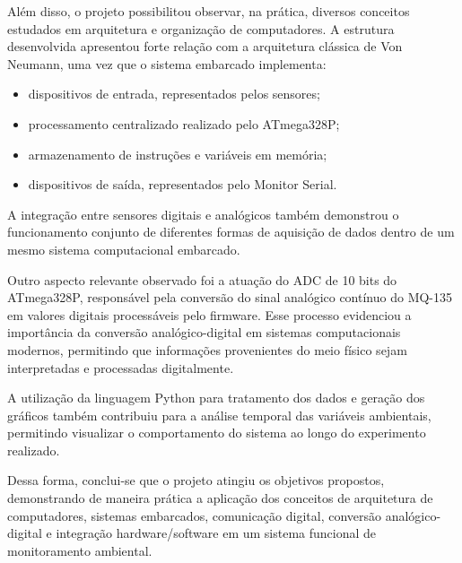 \documentclass[a4paper,12pt]{article}
\begin{document}
Além disso, o projeto possibilitou observar, na prática, diversos conceitos estudados em arquitetura e organização de computadores. A estrutura desenvolvida apresentou forte relação com a arquitetura clássica de Von Neumann, uma vez que o sistema embarcado implementa:
\begin{itemize}
    \item dispositivos de entrada, representados pelos sensores;
    \item processamento centralizado realizado pelo ATmega328P;
    \item armazenamento de instruções e variáveis em memória;
    \item dispositivos de saída, representados pelo Monitor Serial.
\end{itemize}

A integração entre sensores digitais e analógicos também demonstrou o funcionamento conjunto de diferentes formas de aquisição de dados dentro de um mesmo sistema computacional embarcado.

Outro aspecto relevante observado foi a atuação do ADC de 10 bits do ATmega328P, responsável pela conversão do sinal analógico contínuo do MQ-135 em valores digitais processáveis pelo firmware. Esse processo evidenciou a importância da conversão analógico-digital em sistemas computacionais modernos, permitindo que informações provenientes do meio físico sejam interpretadas e processadas digitalmente.

A utilização da linguagem Python para tratamento dos dados e geração dos gráficos também contribuiu para a análise temporal das variáveis ambientais, permitindo visualizar o comportamento do sistema ao longo do experimento realizado.

Dessa forma, conclui-se que o projeto atingiu os objetivos propostos, demonstrando de maneira prática a aplicação dos conceitos de arquitetura de computadores, sistemas embarcados, comunicação digital, conversão analógico-digital e integração hardware/software em um sistema funcional de monitoramento ambiental.

\renewcommand{\refname}{}
\end{document}
